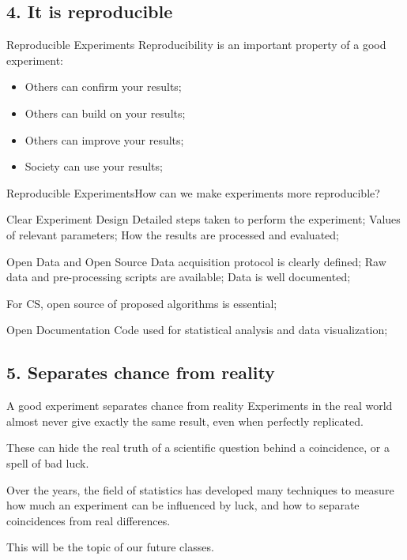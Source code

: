 \subsection{4. It is reproducible}
\begin{frame}{Reproducible Experiments}
  Reproducibility is an important property of a good experiment:
  \bigskip

  \begin{itemize}
    \item Others can confirm your results;
      \medskip
    \item Others can build on your results;
      \medskip
    \item Others can improve your results;
      \medskip
    \item Society can use your results;
  \end{itemize}
\end{frame}

\begin{frame}{Reproducible Experiments}{How can we make experiments more reproducible?}
  \begin{exampleblock}{Clear Experiment Design}
    Detailed steps taken to perform the experiment; Values of relevant parameters; How the results are processed and evaluated;
  \end{exampleblock}
  \begin{exampleblock}{Open Data and Open Source}
    Data acquisition protocol is clearly defined; Raw data and pre-processing scripts are available; Data is well documented;\bigskip

    For CS, open source of proposed algorithms is essential;
  \end{exampleblock}
  \begin{exampleblock}{Open Documentation}
    Code used for statistical analysis and data visualization;
  \end{exampleblock}
\end{frame}

\subsection{5. Separates chance from reality}
\begin{frame}{A good experiment separates chance from reality}
  Experiments in the real world almost never give exactly the same result, even when perfectly replicated.\bigskip

  These  can hide the real truth of a scientific question behind a coincidence, or a spell of bad luck.\bigskip

  Over the years, the field of statistics has developed many techniques to measure how much an experiment can be influenced by luck, and how to separate coincidences from real differences.\bigskip

  This will be the topic of our future classes.
\end{frame}

